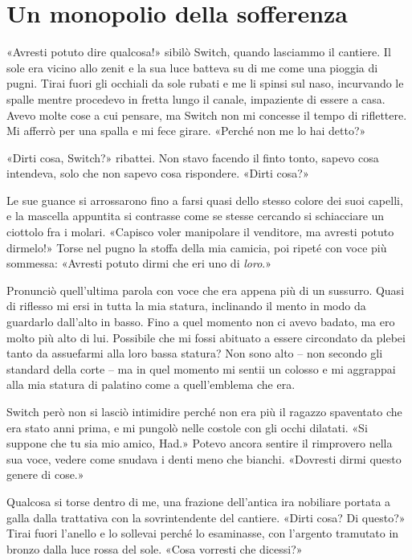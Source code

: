 \chapter{Un monopolio della sofferenza}

«Avresti potuto dire qualcosa!» sibilò Switch, quando lasciammo il
cantiere. Il sole era vicino allo zenit e la sua luce batteva su di me
come una pioggia di pugni. Tirai fuori gli occhiali da sole rubati e me
li spinsi sul naso, incurvando le spalle mentre procedevo in fretta
lungo il canale, impaziente di essere a casa. Avevo molte cose a cui
pensare, ma Switch non mi concesse il tempo di riflettere. Mi afferrò
per una spalla e mi fece girare. «Perché non me lo hai detto?»

«Dirti cosa, Switch?» ribattei. Non stavo facendo il finto tonto, sapevo
cosa intendeva, solo che non sapevo cosa rispondere. «Dirti cosa?»

Le sue guance si arrossarono fino a farsi quasi dello stesso colore dei
suoi capelli, e la mascella appuntita si contrasse come se stesse
cercando si schiacciare un ciottolo fra i molari. «Capisco voler
manipolare il venditore, ma avresti potuto dirmelo!» Torse nel pugno la
stoffa della mia camicia, poi ripeté con voce più sommessa: «Avresti
potuto dirmi che eri uno di \emph{loro}.»

Pronunciò quell'ultima parola con voce che era appena più di un
sussurro. Quasi di riflesso mi ersi in tutta la mia statura, inclinando
il mento in modo da guardarlo dall'alto in basso. Fino a quel momento
non ci avevo badato, ma ero molto più alto di lui. Possibile che mi
fossi abituato a essere circondato da plebei tanto da assuefarmi alla
loro bassa statura? Non sono alto -- non secondo gli standard della
corte -- ma in quel momento mi sentii un colosso e mi aggrappai alla mia
statura di palatino come a quell'emblema che era.

Switch però non si lasciò intimidire perché non era più il ragazzo
spaventato che era stato anni prima, e mi pungolò nelle costole con gli
occhi dilatati. «Si suppone che tu sia mio amico, Had.» Potevo ancora
sentire il rimprovero nella sua voce, vedere come snudava i denti meno
che bianchi. «Dovresti dirmi questo genere di cose.»

Qualcosa si torse dentro di me, una frazione dell'antica ira nobiliare
portata a galla dalla trattativa con la sovrintendente del cantiere.
«Dirti cosa? Di questo?» Tirai fuori l'anello e lo sollevai perché lo
esaminasse, con l'argento tramutato in bronzo dalla luce rossa del sole.
«Cosa vorresti che dicessi?»

